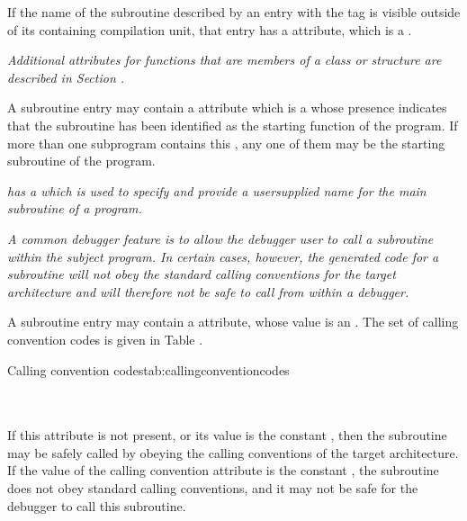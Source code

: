 If the name of the subroutine described by an entry with the
tag \DWTAGsubprogram{}
is visible outside of its containing
\hypertarget{chap:DWATexternalexternalsubroutine}{}
compilation unit, that entry has 
a 
\DWATexternal{} attribute,
which is a .

\textit{Additional attributes for functions that are members of a
class or structure are described in 
Section .
}

A 
\hypertarget{chap:DWATmainsubprogrammainorstartingsubprogram}{}
subroutine entry 
may contain a 
\DWATmainsubprogram{}
attribute 
which is 
a  whose presence indicates that the
subroutine has been identified as the starting function of
the program.  If more than one subprogram contains this 
,
any one of them may be the starting subroutine of the program.

\textit{ has a  
which is used to specify
and provide a user\dash supplied name for the main subroutine of
a program.
}

\textit{A common debugger feature is to allow the debugger user to call
a subroutine within the subject program. In certain cases,
however, the generated code for a subroutine will not obey
the standard calling conventions for the target architecture
and will therefore not be safe to call from within a debugger.
}

A subroutine entry may 
\hypertarget{chap:DWATcallingconventionsubprogramcallingconvention}{}
contain a 
\DWATcallingconvention{}
attribute, whose value is an 
. The set of
calling convention codes is given in 
Table .

\begin{simplenametable}[1.4in]{Calling convention codes}{tab:callingconventioncodes}
\DWCCnormalINDX        \\
\DWCCprogramINDX       \\
\DWCCnocallINDX        \\
\end{simplenametable}

If this attribute is not present, or its value is the constant
\DWCCnormalTARG, then the subroutine may be safely called by
obeying the  calling conventions of the target
architecture. If the value of the calling convention attribute
is the constant \DWCCnocallTARG, the subroutine does not obey
standard calling conventions, and it may not be safe for the
debugger to call this subroutine.

